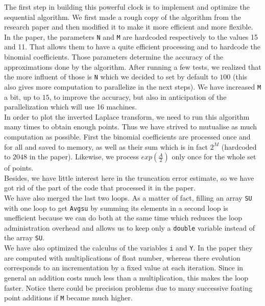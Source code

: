 \documentclass[11pt,a4paper]{article}
\begin{document}
The first step in building this powerful clock is to implement and optimize the sequential algorithm. We first made a rough copy of the algorithm from the research paper and then modified it to make it more efficient and more flexible.\\

In the paper, the parameters \verb_N_ and \verb_M_ are hardcoded respectively to the values 15 and 11. That allows them to have a quite efficient processing and to hardcode the binomial coefficients. Those parameters determine the accuracy of the approximations done by the algorithm. After running a few tests, we realized that the more influent of those is \verb_N_ which we decided to set by default to $100$ (this also gives more computation to parallelize in the next steps). We have increased \verb_M_ a bit, up to $15$, to improve the accuracy, but also in anticipation of the parallelization which will use 16 machines.\\

In order to plot the inverted Laplace transform, we need to run this algorithm many times to obtain enough points. Thus we have strived to mutualise as much computation as possible. First the binomial coefficients are processed once and for all and saved to memory, as well as their sum which is in fact $2^M$ (hardcoded to $2048$ in the paper). Likewise, we process $exp(\frac{A}{2})$ only once for the whole set of points.\\

Besides, we have little interest here in the truncation error estimate, so we have got rid of the part of the code that processed it in the paper.\\

We have also merged the last two loops. As a matter of fact, filling an array \verb_SU_ with one loop to get \verb_Avgsu_ by summing its elements in a second loop is unefficient because we can do both at the same time which reduces the loop administration overhead and allows us to keep only a \verb_double_ variable instead of the array \verb_SU_.\\

We have also optimized the calculus of the variables \verb_i_ and \verb_Y_. In the paper they are computed with multiplications of float number, whereas there evolution corresponds to an incrementation by a fixed value at each iteration. Since in general an addition costs much less than a multiplication, this makes the loop faster. Notice there could be precision problems due to many successive foating point additions if \verb_M_ became much higher.\\
\end{document}
